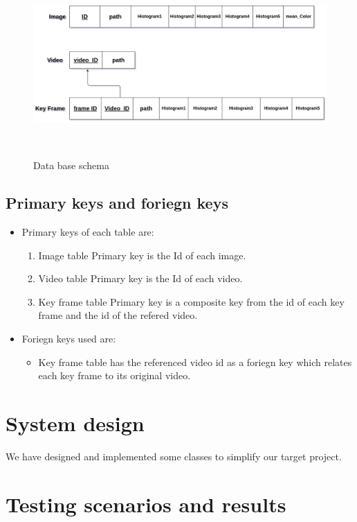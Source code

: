 \begin{figure}[H]
    \centering
    \includegraphics[width=120mm,height=70mm]{Images/database.png}
    \caption{Data base schema}
  \end{figure}
\subsection{Primary keys and foriegn keys}
\begin{itemize}
    \item Primary keys of each table are:
    \begin{enumerate}
        \item Image table Primary key is the Id of each image.      
        \item Video table Primary key is the Id of each video.
        \item Key frame table Primary key is a composite key from the id of each key frame and the id of the refered video.  
    \end{enumerate}        
    \item Foriegn keys used are:
    \begin{itemize}
        \item Key frame table has the referenced video id as a foriegn key which relates each key frame to its original video.      
    \end{itemize}
\end{itemize}

\section{System design}
We have designed and implemented some classes to simplify our target project.




\section{Testing scenarios and results}
